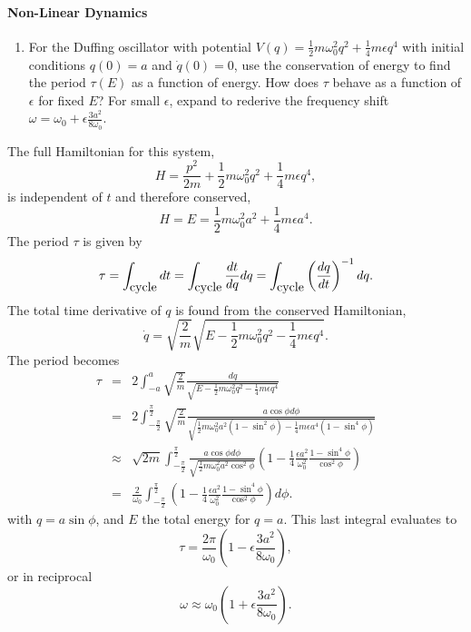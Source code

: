 \documentclass[letterpaper,11pt]{article}
\begin{document}
\paragraph*{Non-Linear Dynamics}
\begin{enumerate}[resume]
 \item For the Duffing oscillator with potential $V(q) = \frac{1}{2} m \omega_0^2 q^2 + \frac{1}{4} m \epsilon q^4$ with initial conditions $q(0) = a$ and $\dot{q}(0) = 0$, use the conservation of energy to find the period $\tau(E)$ as a function of energy.  How does $\tau$ behave as a function of $\epsilon$ for fixed $E$?  For small $\epsilon$, expand to rederive the frequency shift $\omega = \omega_0 + \epsilon \frac{3a^2}{8\omega_0}$.
\end{enumerate}
The full Hamiltonian for this system,
\begin{equation*}
 H = \frac{p^2}{2m} + \frac{1}{2} m \omega_0^2 q^2 + \frac{1}{4} m \epsilon q^4,
\end{equation*}
is independent of $t$ and therefore conserved,
\begin{equation*}
 H = E = \frac{1}{2} m \omega_0^2 a^2 + \frac{1}{4} m \epsilon a^4.
\end{equation*}
The period $\tau$ is given by
\begin{equation*}
 \tau = \int_{\hbox{cycle}} dt = \int_{\hbox{cycle}} \frac{dt}{dq} dq = \int_{\hbox{cycle}} \left(\frac{dq}{dt}\right)^{-1} dq.
\end{equation*}
The total time derivative of $q$ is found from the conserved Hamiltonian,
\begin{equation*}
 \dot{q} = \sqrt{\frac{2}{m}} \sqrt{E - \frac{1}{2}m\omega_0^2 q^2 - \frac{1}{4}m\epsilon q^4}.
\end{equation*}
The period becomes
\begin{eqnarray*}
 \tau & = & 2 \int_{-a}^{a} \sqrt{\frac{2}{m}} \frac{dq}{\sqrt{E - \frac{1}{2}m\omega_0^2 q^2 - \frac{1}{4}m\epsilon q^4}} \\
 & = & 2 \int_{-\frac{\pi}{2}}^{\frac{\pi}{2}} \sqrt{\frac{2}{m}} \frac{a \cos\phi d\phi}{\sqrt{\frac{1}{2}m\omega_0^2 a^2 (1 - \sin^2\phi) - \frac{1}{4}m\epsilon a^4 (1 - \sin^4\phi)}} \\
 & \approx & \sqrt{2 m} \int_{-\frac{\pi}{2}}^{\frac{\pi}{2}} \frac{a \cos\phi d\phi}{\sqrt{\frac{1}{2}m\omega_0^2 a^2 \cos^2\phi}} \left(1 - \frac{1}{4} \frac{\epsilon a^2}{\omega_0^2} \frac{1 - \sin^4\phi}{\cos^2\phi} \right) \\
 & = & \frac{2}{\omega_0} \int_{-\frac{\pi}{2}}^{\frac{\pi}{2}} \left(1 - \frac{1}{4} \frac{\epsilon a^2}{\omega_0^2} \frac{1 - \sin^4\phi}{\cos^2\phi} \right) d\phi.
\end{eqnarray*}
with $q = a \sin\phi$, and $E$ the total energy for $q = a$.  This last integral evaluates to
\begin{equation*}
 \tau = \frac{2\pi}{\omega_0} \left( 1 - \epsilon \frac{3a^2}{8\omega_0} \right),
\end{equation*}
or in reciprocal
\begin{equation*}
 \omega \approx \omega_0 \left( 1 + \epsilon \frac{3a^2}{8\omega_0} \right).
\end{equation*}
\end{document}
